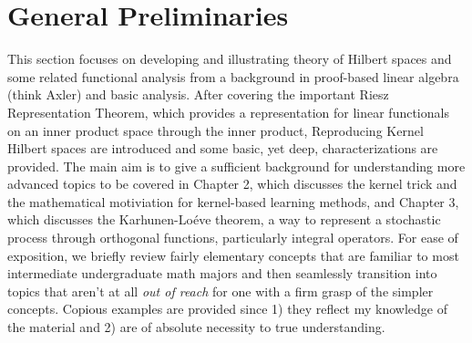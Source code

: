 \documentclass{article}
\theoremstyle{definition}
\theoremstyle{remark}
\numberwithin{equation}{section}
\begin{document}
\pagebreak
\tableofcontents
\pagebreak

\section{General Preliminaries} This section focuses on developing and illustrating theory of Hilbert spaces and some related functional analysis from a background in proof-based linear algebra (think Axler) and basic analysis. After covering the important Riesz Representation Theorem, which provides a representation for linear functionals on an inner product space through the inner product, Reproducing Kernel Hilbert spaces are introduced and some basic, yet deep, characterizations are provided. The main aim is to give a sufficient background for understanding more advanced topics to be covered in Chapter 2, which discusses the kernel trick and the mathematical motiviation for kernel-based learning methods, and Chapter 3, which discusses the Karhunen-Lo\'{e}ve theorem, a way to represent a stochastic process through orthogonal functions, particularly integral operators. For ease of exposition, we briefly review fairly elementary concepts that are familiar to most intermediate undergraduate math majors and then seamlessly transition into topics that aren't at all \textit{out of reach} for one with a firm grasp of the simpler concepts. Copious examples are provided since 1) they reflect my knowledge of the material and 2) are of absolute necessity to true understanding. 
\end{document}
